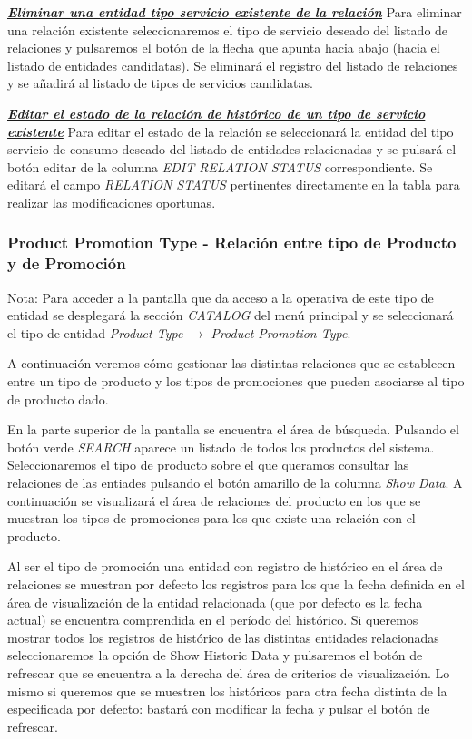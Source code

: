 \underline{\textsl{\textbf{Eliminar una entidad tipo servicio existente de la relación}}}\newline
Para eliminar una relación existente seleccionaremos el tipo de servicio deseado del listado de relaciones y pulsaremos el botón de la flecha que apunta hacia abajo (hacia el listado de entidades candidatas). Se eliminará el registro del listado de relaciones y se añadirá al listado de tipos de servicios candidatas.


\underline{\textsl{\textbf{Editar el estado de la relación de histórico de un tipo de servicio existente}}}
Para editar el estado de la relación se seleccionará la entidad del tipo servicio de consumo deseado del listado de entidades relacionadas y se pulsará el botón editar de la columna \textit{EDIT RELATION STATUS} correspondiente. Se editará el campo \emph{RELATION STATUS} pertinentes directamente en la tabla para realizar las modificaciones oportunas.




\subsubsection{Product Promotion Type - Relación entre tipo de Producto y de Promoción}
\label{sub:product-promotion-type-relation}

Nota: Para acceder a la pantalla que da acceso a la operativa de este tipo de entidad se desplegará la sección \emph{CATALOG} del menú principal y se seleccionará el tipo de entidad \emph{Product Type} $\rightarrow$  \emph{Product Promotion Type}.


A continuación veremos cómo gestionar las distintas relaciones que se establecen entre un tipo de producto y los tipos de promociones que pueden asociarse al tipo de producto dado.


En la parte superior de la pantalla se encuentra el área de búsqueda. Pulsando el botón verde \emph{SEARCH} aparece un listado de todos los productos del sistema. Seleccionaremos el tipo de producto sobre el que queramos consultar las relaciones de las entiades pulsando el botón amarillo de la columna \emph{Show Data}. A continuación se visualizará el área de relaciones del producto en los que se muestran los tipos de promociones para los que existe una relación con el producto.

Al ser el tipo de promoción una entidad con registro de histórico en el área de relaciones se muestran por defecto los registros para los que la fecha definida en el área de visualización de la entidad relacionada (que por defecto es la fecha actual) se encuentra comprendida en el período del histórico. Si queremos mostrar todos los registros de histórico de las distintas entidades relacionadas seleccionaremos la opción de Show Historic Data y pulsaremos el botón de refrescar que se encuentra a la derecha del área de criterios de visualización. Lo mismo si queremos que se muestren los históricos para otra fecha distinta de la especificada por defecto: bastará con modificar la fecha y pulsar el botón de refrescar.

